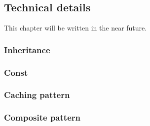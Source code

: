 \subsection{Technical details}
This chapter will be written in the near future.
    \subsubsection*{Inheritance}
    \label{inheritance}
    \subsubsection*{Const}
    \label{const}
    \subsubsection*{Caching pattern}
    \label{cachingpattern}
    \subsubsection*{Composite pattern}
    \label{compositepattern}    